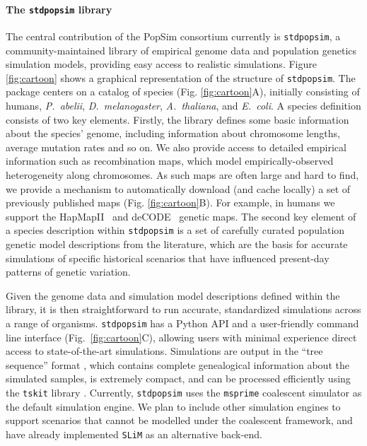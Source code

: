 \documentclass[12pt,halfline,a4paper]{ouparticle}
\newcommand{\stdpopsim}{\texttt{stdpopsim}\xspace}
\newcommand{\tskit}{\texttt{tskit}\xspace}
\begin{document}
\paragraph{The \stdpopsim library}
The central contribution of the PopSim consortium currently is \stdpopsim, a
community-maintained library of empirical genome data and population genetics simulation
models, providing easy access to realistic simulations. Figure \ref{fig:cartoon} shows a graphical
representation of the structure of \stdpopsim. The package centers
on a catalog of species (Fig. \ref{fig:cartoon}A), initially consisting of humans, \emph{P.~abelii}, 
\emph{D.~melanogaster}, \emph{A.~thaliana}, and \emph{E.~coli}.
A species definition consists of two key elements.  Firstly, the library defines
some basic information about the species' genome, including information about chromosome
lengths, average mutation rates and so on. We also provide access to detailed
empirical information such as recombination maps, which model empirically-observed
heterogeneity along chromosomes. As such maps are often large and hard
to find, we provide a mechanism to automatically download (and cache locally) a
set of previously published maps (Fig. \ref{fig:cartoon}B). For example, in humans we support the
HapMapII~\citep{international2007second} and
deCODE~\citep{kong2010fine} genetic maps. The second key element of a species description
within \stdpopsim is a set of carefully curated population genetic model
descriptions from the literature, which are the basis for accurate simulations
of specific historical scenarios that have influenced present-day patterns of
genetic variation.

Given the genome data and simulation model descriptions defined within the
library, it is then straightforward to run accurate, standardized simulations
across a range of organisms. \stdpopsim has a Python API and a user-friendly
command line interface (Fig.~\ref{fig:cartoon}C), allowing users with minimal experience direct access to
state-of-the-art simulations. Simulations are output in the “tree sequence”
format \citep{kelleher2016efficient,kelleher2018efficient,kelleher2019inferring}, which
contains complete genealogical information about the simulated samples, is
extremely compact, and can be processed efficiently using the \tskit library
\citep{kelleher2016efficient,kelleher2018efficient}. Currently,
\stdpopsim uses the  \texttt{msprime} coalescent simulator \citep{kelleher2016efficient}
as the default simulation engine. We plan to include other simulation
engines to support scenarios that cannot be modelled under the coalescent framework,
and have already implemented \texttt{SLiM} \citep{haller2019slim} as
an alternative back-end.
\end{document}
